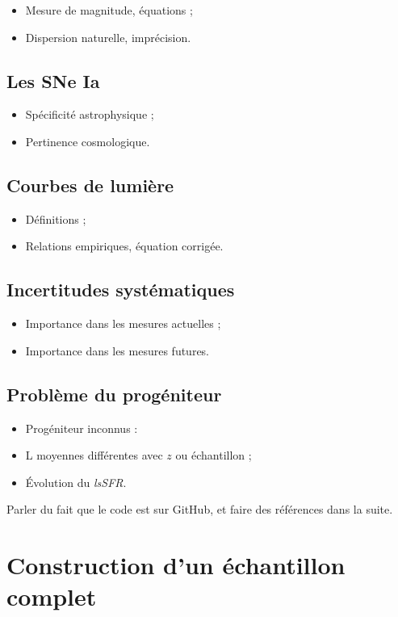 \documentclass[a4paper, 12pt, svgnames]{article}
\begin{document}
\begin{itemize}
    \item Mesure de magnitude, équations ;
    \item Dispersion naturelle, imprécision.
\end{itemize}

\subsection{Les SNe Ia}
\begin{itemize}
    \item Spécificité astrophysique ;
    \item Pertinence cosmologique.
\end{itemize}

\subsection{Courbes de lumière}
\begin{itemize}
    \item Définitions ;
    \item Relations empiriques, équation corrigée.
\end{itemize}

\subsection{Incertitudes systématiques}
\begin{itemize}
    \item Importance dans les mesures actuelles ;
    \item Importance dans les mesures futures.
\end{itemize}

\subsection{Problème du progéniteur}
\begin{itemize}
    \item Progéniteur inconnus :
    \item L moyennes différentes avec $z$ ou échantillon ;
    \item Évolution du \textit{lsSFR}.
\end{itemize}

Parler du fait que le code est sur GitHub, et faire des références dans la
suite.

\section{Construction d'un échantillon complet}
\end{document}
